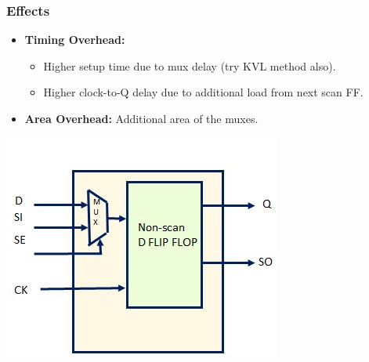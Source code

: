 \documentclass[11pt]{article}
\begin{document}
\begin{minipage}{0.55\textwidth}
    \subsubsection*{Effects}
    \begin{itemize}
      \item \textbf{Timing Overhead:}
        \begin{itemize}
          \item Higher setup time due to mux delay (try KVL method also).
          \item Higher clock-to-Q delay due to additional load from next scan FF.
        \end{itemize}
      \item \textbf{Area Overhead:} Additional area of the muxes.
    \end{itemize}    
\end{minipage}
\hfill
\begin{minipage}{0.35\textwidth}
  \includegraphics[scale=0.4]{1.jpg}
\end{minipage}
\end{document}

